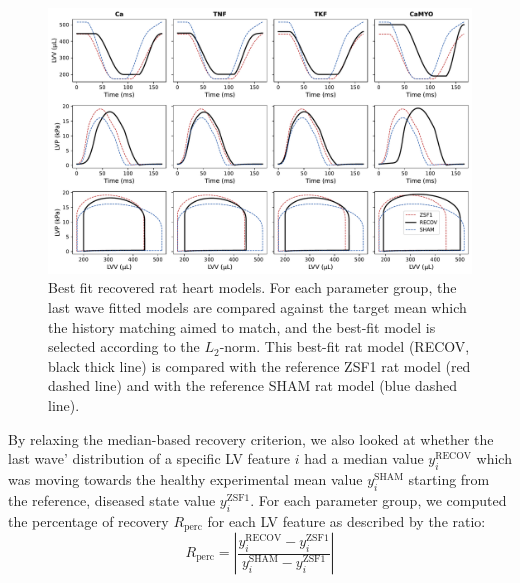 \begin{figure}[ht!]
    \myfloatalign
    \includegraphics[width=\textwidth]{figures/chapter07/Fig_7.pdf}
    \caption{Best fit recovered rat heart models. For each parameter group, the last wave fitted models are compared against the target mean which the history matching aimed to match, and the best-fit model is selected according to the $L_2$-norm. This best-fit rat model (RECOV, black thick line) is compared with the reference ZSF1 rat model (red dashed line) and with the reference SHAM rat model (blue dashed line).}
    \label{fig:bestfits}
\end{figure}

\vspace{0.2cm}
By relaxing the median-based recovery criterion, we also looked at whether the last wave' distribution of a specific LV feature $i$ had a median value $y_{i}^{\textrm{RECOV}}$ which was moving towards the healthy experimental mean value $y_{i}^{\textrm{SHAM}}$ starting from the reference, diseased state value $y_{i}^{\textrm{ZSF1}}$. For each parameter group, we computed the percentage of recovery $R_{\textrm{perc}}$ for each LV feature as described by the ratio:
%
\begin{equation}
    R_{\textrm{perc}} = \left|\frac{y_{i}^{\textrm{RECOV}}-y_{i}^{\textrm{ZSF1}}}{y_{i}^{\textrm{SHAM}}-y_{i}^{\textrm{ZSF1}}}\right|
\end{equation}

